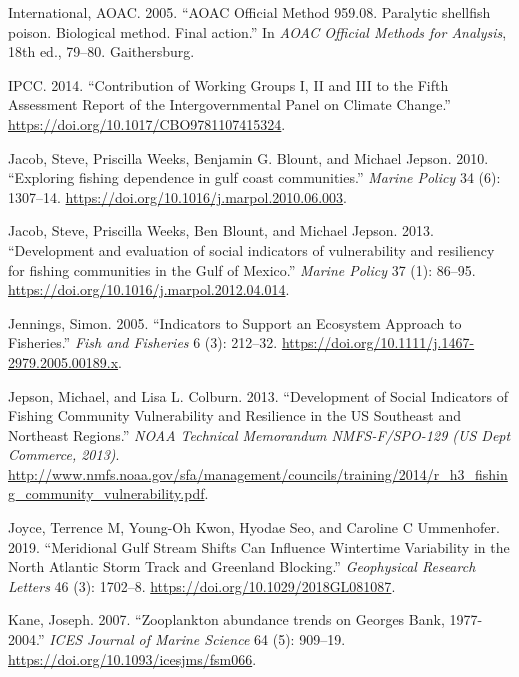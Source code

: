 \documentclass[
]{book}
\begin{document}
\leavevmode\hypertarget{ref-Anonymous2005}{}%
International, AOAC. 2005. ``AOAC Official Method 959.08. Paralytic shellfish poison. Biological method. Final action.'' In \emph{AOAC Official Methods for Analysis}, 18th ed., 79--80. Gaithersburg.

\leavevmode\hypertarget{ref-IPCC2014}{}%
IPCC. 2014. ``Contribution of Working Groups I, II and III to the Fifth Assessment Report of the Intergovernmental Panel on Climate Change.'' \url{https://doi.org/10.1017/CBO9781107415324}.

\leavevmode\hypertarget{ref-Jacob2010}{}%
Jacob, Steve, Priscilla Weeks, Benjamin G. Blount, and Michael Jepson. 2010. ``Exploring fishing dependence in gulf coast communities.'' \emph{Marine Policy} 34 (6): 1307--14. \url{https://doi.org/10.1016/j.marpol.2010.06.003}.

\leavevmode\hypertarget{ref-Jacob2013}{}%
Jacob, Steve, Priscilla Weeks, Ben Blount, and Michael Jepson. 2013. ``Development and evaluation of social indicators of vulnerability and resiliency for fishing communities in the Gulf of Mexico.'' \emph{Marine Policy} 37 (1): 86--95. \url{https://doi.org/10.1016/j.marpol.2012.04.014}.

\leavevmode\hypertarget{ref-jennings_indicators_2005}{}%
Jennings, Simon. 2005. ``Indicators to Support an Ecosystem Approach to Fisheries.'' \emph{Fish and Fisheries} 6 (3): 212--32. \url{https://doi.org/10.1111/j.1467-2979.2005.00189.x}.

\leavevmode\hypertarget{ref-jepson_development_2013}{}%
Jepson, Michael, and Lisa L. Colburn. 2013. ``Development of Social Indicators of Fishing Community Vulnerability and Resilience in the US Southeast and Northeast Regions.'' \emph{NOAA Technical Memorandum NMFS-F/SPO-129 (US Dept Commerce, 2013)}. \url{http://www.nmfs.noaa.gov/sfa/management/councils/training/2014/r_h3_fishing_community_vulnerability.pdf}.

\leavevmode\hypertarget{ref-joyce2019}{}%
Joyce, Terrence M, Young-Oh Kwon, Hyodae Seo, and Caroline C Ummenhofer. 2019. ``Meridional Gulf Stream Shifts Can Influence Wintertime Variability in the North Atlantic Storm Track and Greenland Blocking.'' \emph{Geophysical Research Letters} 46 (3): 1702--8. \url{https://doi.org/10.1029/2018GL081087}.

\leavevmode\hypertarget{ref-Kane2007}{}%
Kane, Joseph. 2007. ``Zooplankton abundance trends on Georges Bank, 1977-2004.'' \emph{ICES Journal of Marine Science} 64 (5): 909--19. \url{https://doi.org/10.1093/icesjms/fsm066}.
\end{document}

